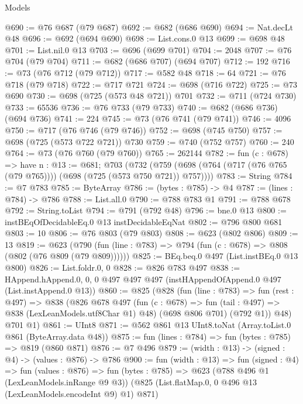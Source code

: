 \begin{lexlean}{Models}
\begin{coremodule}
@690 := @76 @687 (@79 @687)
@692 := @682 (@686 @690)
@694 := Nat.decLt @48
@696 := @692 (@694 @690)
@698 := List.cons.{0} @13
@699 := @698 @48
@701 := List.nil.{0} @13
@703 := @696 (@699 @701)
@704 := 2048
@707 := @76 @704 (@79 @704)
@711 := @682 (@686 @707) (@694 @707)
@712 := 192
@716 := @73 (@76 @712 (@79 @712))
@717 := @582 @48
@718 := 64
@721 := @76 @718 (@79 @718)
@722 := @717 @721
@724 := @698 (@716 @722)
@725 := @73 @690
@730 := @698 (@725 (@573 @48 @721)) @701
@732 := @711 (@724 @730)
@733 := 65536
@736 := @76 @733 (@79 @733)
@740 := @682 (@686 @736) (@694 @736)
@741 := 224
@745 := @73 (@76 @741 (@79 @741))
@746 := 4096
@750 := @717 (@76 @746 (@79 @746))
@752 := @698 (@745 @750)
@757 := @698 (@725 (@573 @722 @721)) @730
@759 := @740 (@752 @757)
@760 := 240
@764 := @73 (@76 @760 (@79 @760))
@765 := 262144
@782 := fun (c : @678) =>
  have n : @13 := @681;
  @703 (@732 (@759 (@698 (@764 (@717 (@76 @765 (@79 @765)))) (@698 (@725 (@573 @750 @721)) @757))))
@783 := String
@784 := @7 @783
@785 := ByteArray
@786 := (bytes : @785) -> @4
@787 := (lines : @784) -> @786
@788 := List.all.{0}
@790 := @788 @783 @1
@791 := @788 @678
@792 := String.toList
@794 := @791 (@792 @48)
@796 := bne.{0} @13
@800 := instBEqOfDecidableEq.{0} @13 instDecidableEqNat
@802 := @796 @800 @681
@803 := 10
@806 := @76 @803 (@79 @803)
@808 := @623 (@802 @806)
@809 := 13
@819 := @623
    (@790 (fun (line : @783) => @794 (fun (c : @678) => @808 (@802 (@76 @809 (@79 @809))))))
@825 := BEq.beq.{0} @497 (List.instBEq.{0} @13 @800)
@826 := List.foldr.{0, 0}
@828 := @826 @783 @497
@838 := HAppend.hAppend.{0, 0, 0}
    @497
    @497
    @497
    (instHAppendOfAppend.{0} @497 (List.instAppend.{0} @13))
@860 := @825
    (@828
      (fun (line : @783) =>
      fun (rest : @497) =>
      @838
        (@826
          @678
          @497
          (fun (c : @678) => fun (tail : @497) => @838 (LexLeanModels.utf8Char @1) @48)
          (@698 @806 @701)
          (@792 @1))
        @48)
      @701
      @1)
@861 := UInt8
@871 := @562 @861 @13 UInt8.toNat (Array.toList.{0} @861 (ByteArray.data @48))
@875 := fun (lines : @784) => fun (bytes : @785) => @819 (@860 @871)
@876 := @7 @496
@879 := (width : @13) -> (signed : @4) -> (values : @876) -> @786
@900 := fun (width : @13) =>
  fun (signed : @4) =>
  fun (values : @876) =>
  fun (bytes : @785) =>
  @623
    (@788 @496 @1 (LexLeanModels.inRange @9 @3))
    (@825 (List.flatMap.{0, 0} @496 @13 (LexLeanModels.encodeInt @9) @1) @871)
\end{coremodule}
\end{lexlean}
